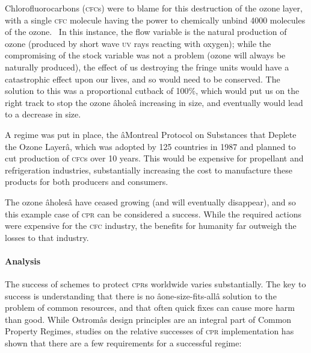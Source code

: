 Chlorofluorocarbons (\textsc{cfc}s) were to blame for this destruction of the ozone layer, with a single \textsc{cfc} molecule having the power to chemically unbind 4000 molecules of the ozone.~\cite{Canada-sea-law} In this instance, the flow variable is the natural production of ozone (produced by short wave \textsc{uv} rays reacting with oxygen); while the compromising of the stock variable was not a problem (ozone will always be naturally produced), the effect of us destroying the fringe units would have a catastrophic effect upon our lives, and so would need to be conserved. The solution to this was a proportional cutback of 100\%, which would put us on the right track to stop the ozone âholeâ increasing in size, and eventually would lead to a decrease in size.

A regime was put in place, the âMontreal Protocol on Substances that Deplete the Ozone Layerâ, which was adopted by 125 countries in 1987 and planned to cut production of \textsc{cfc}s over 10 years. This would be expensive for propellant and refrigeration industries, substantially increasing the cost to manufacture these products for both producers and consumers.

The ozone âholesâ have ceased growing (and will eventually disappear), and so this example case of \textsc{cpr} can be considered a success. While the required actions were expensive for the \textsc{cfc} industry, the benefits for humanity far outweigh the losses to that industry.

\paragraph{Analysis}

The success of schemes to protect \textsc{cpr}s worldwide varies substantially. The key to success is understanding that there is no âone-size-fits-allâ solution to the problem of common resources, and that often quick fixes can cause more harm than good. While Ostromâs design principles are an integral part of Common Property Regimes, studies on the relative successes of \textsc{cpr} implementation has shown that there are a few requirements for a successful regime:~\cite{Ostrom-challenge-90}

